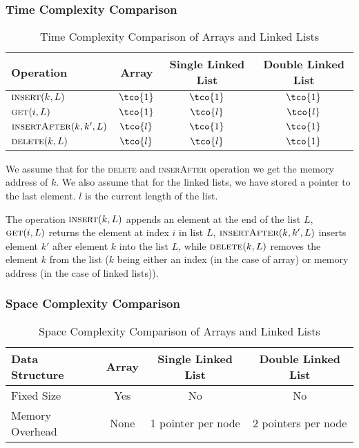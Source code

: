 \subsubsection{Time Complexity Comparison}
\begin{table}[h!]
    \centering
    \begin{tabular}{lccc}
        \toprule
        \textbf{Operation}               & \textbf{Array} & \textbf{Single Linked List} & \textbf{Double Linked List} \\
        \midrule
        $\textsc{insert}(k, L)$          & $\tco{1}$      & $\tco{1}$                   & $\tco{1}$                   \\
        $\textsc{get}(i, L)$             & $\tco{1}$      & $\tco{l}$                   & $\tco{l}$                   \\
        $\textsc{insertAfter}(k, k', L)$ & $\tco{l}$      & $\tco{1}$                   & $\tco{1}$                   \\
        $\textsc{delete}(k, L)$          & $\tco{l}$      & $\tco{l}$                   & $\tco{1}$                   \\
        \bottomrule
    \end{tabular}
    \smallskip
    \begin{flushleft}
        \footnotesize We assume that for the \textsc{delete} and \textsc{inserAfter} operation we get the memory address of $k$. We also assume that for the linked lists, we have stored a pointer to the last element. $l$ is the current length of the list.
    \end{flushleft}

    \caption{Time Complexity Comparison of Arrays and Linked Lists}
\end{table}
The operation $\textsc{insert}(k, L)$ appends an element at the end of the list $L$, $\textsc{get}(i, L)$ returns the element at index $i$ in list $L$, $\textsc{insertAfter}(k, k', L)$ inserts element $k'$ after element $k$ into the list $L$, while $\textsc{delete}(k, L)$ removes the element $k$ from the list ($k$ being either an index (in the case of array) or memory address (in the case of linked lists)).

\subsubsection{Space Complexity Comparison}
\begin{table}[h]
    \centering
    \begin{tabular}{lccc}
        \toprule
        \textbf{Data Structure} & \textbf{Array} & \textbf{Single Linked List} & \textbf{Double Linked List} \\
        \midrule
        Fixed Size              & Yes            & No                          & No                          \\
        Memory Overhead         & None           & 1 pointer per node          & 2 pointers per node         \\
        \bottomrule
    \end{tabular}
    \caption{Space Complexity Comparison of Arrays and Linked Lists}
\end{table}


